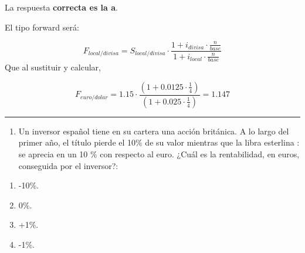 \documentclass[
  letterpaper,
  DIV=11,
  numbers=noendperiod]{scrreprt}
\providecommand{\tightlist}{%
  \setlength{\itemsep}{0pt}\setlength{\parskip}{0pt}}\usepackage{longtable,booktabs,array}
\begin{document}
\begin{tcolorbox}[enhanced jigsaw, left=2mm, opacityback=0, colback=white, breakable, arc=.35mm, bottomrule=.15mm, rightrule=.15mm, toprule=.15mm, leftrule=.75mm, colframe=quarto-callout-tip-color-frame]
\begin{minipage}[t]{5.5mm}
\textcolor{quarto-callout-tip-color}{\faLightbulb}
\end{minipage}%
\begin{minipage}[t]{\textwidth - 5.5mm}

La respuesta \textbf{correcta es la a}.

El tipo forward será:

\[F_{local/divisa}=S_{local/divisa}\cdot{}\frac{1+i_{divisa}\cdot \frac{n}{base}}{1+i_{local}\cdot \frac{n}{base}}\]
Que al sustituir y calcular,

\[F_{euro/dolar}=1.15\cdot\frac{\left(1+0.0125\cdot\frac{1}{4}\right)}{\left(1+0.025\cdot\frac{1}{4}\right)}=1.147\]

\end{minipage}%
\end{tcolorbox}

\begin{center}\rule{0.5\linewidth}{0.5pt}\end{center}

\begin{enumerate}
\def\labelenumi{\arabic{enumi}.}
\setcounter{enumi}{22}
\tightlist
\item
  Un inversor español tiene en su cartera una acción británica. A lo
  largo del primer año, el título pierde el 10\% de su valor mientras
  que la libra esterlina : se aprecia en un 10 \% con respecto al euro.
  ¿Cuál es la rentabilidad, en euros, conseguida por el inversor?:
\end{enumerate}

\begin{enumerate}
\def\labelenumi{\alph{enumi})}
\item
  -10\%.
\item
  0\%.
\item
  +1\%.
\item
  -1\%.
\end{enumerate}
\end{document}
